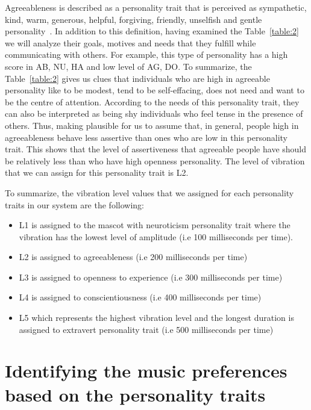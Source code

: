 Agreeableness is described as a personality trait that is perceived as sympathetic,
kind, warm, generous, helpful, forgiving, friendly, unselfish and gentle personality~\cite{matthews2003personality}.
In addition to this definition, having examined the Table~\ref{table:2} we will
analyze their goals, motives and needs that they fulfill while communicating with others.
For example, this type of personality has a high score in AB, NU, HA and low level
of AG, DO. To summarize, the Table~\ref{table:2} gives us clues that individuals who
are high in agreeable personality like to be modest, tend to be self-effacing,
does not need and want to be the centre of attention.
According to the needs of this personality trait, they can also be interpreted as
being shy individuals who feel tense in the presence of others.
Thus, making plausible for us to assume that, in general, people high in agreeableness
behave less assertive than ones who are low in this personality trait.
This shows that the level of assertiveness that agreeable people have should be
relatively less than who have high openness personality.
The level of vibration that we can assign for this personality trait is L2.


To summarize, the vibration level values that we assigned for each personality traits in our system are the following:
\begin{itemize}
\item L1 is assigned to the mascot with neuroticism personality trait where the
      vibration has the lowest level of amplitude (i.e 100 milliseconds per time).
\item L2 is assigned to agreeableness (i.e 200 milliseconds per time)
\item L3 is assigned to openness to experience (i.e 300 milliseconds per time)
\item L4 is assigned to conscientiousness (i.e 400 milliseconds per time)
\item L5 which represents the highest vibration level and the longest duration
      is assigned to extravert personality trait (i.e 500 milliseconds per time)
\end{itemize}



\section{Identifying the music preferences based on the personality traits}
\label{sec:Identifying the music preferences based on the personality traits}

